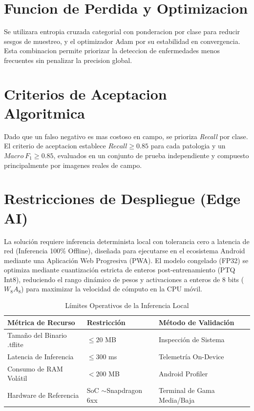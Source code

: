 \documentclass[10pt,journal,compsoc]{IEEEtran} %
\begin{document}
\section{Funcion de Perdida y Optimizacion}
Se utilizara entropia cruzada categorial con ponderacion por clase para reducir sesgos de muestreo, y el optimizador Adam por su estabilidad en convergencia. Esta combinacion permite priorizar la deteccion de enfermedades menos frecuentes sin penalizar la precision global.

\section{Criterios de Aceptacion Algoritmica}
Dado que un falso negativo es mas costoso en campo, se prioriza \textit{Recall} por clase. El criterio de aceptacion establece $Recall \ge 0.85$ para cada patologia y un $Macro\ F_1 \ge 0.85$, evaluados en un conjunto de prueba independiente y compuesto principalmente por imagenes reales de campo.

\section{Restricciones de Despliegue (Edge AI)}
La solución requiere inferencia determinista local con tolerancia cero a latencia de red (Inferencia 100\% Offline), diseñada para ejecutarse en el ecosistema Android mediante una Aplicación Web Progresiva (PWA). El modelo congelado (FP32) se optimiza mediante cuantización estricta de enteros post-entrenamiento (PTQ Int8), reduciendo el rango dinámico de pesos y activaciones a enteros de 8 bits ($W_8 A_8$) para maximizar la velocidad de cómputo en la CPU móvil.

\begin{table}[h]
\caption{Límites Operativos de la Inferencia Local}
\label{tab:restricciones}
\centering
\begin{tabularx}{\columnwidth}{lXX}
\toprule
\textbf{Métrica de Recurso} & \textbf{Restricción} & \textbf{Método de Validación} \\
\midrule
Tamaño del Binario .tflite & $\le 20$ MB & Inspección de Sistema  \\
Latencia de Inferencia & $\le 300$ ms & Telemetría On-Device  \\
Consumo de RAM Volátil & $< 200$ MB & Android Profiler  \\
Hardware de Referencia & SoC $\sim$Snapdragon 6xx & Terminal de Gama Media/Baja  \\
\bottomrule
\end{tabularx}
\end{table}
\end{document}
